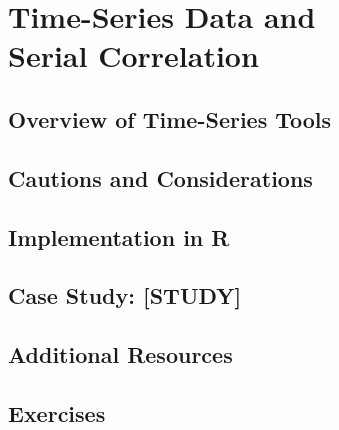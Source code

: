 
\chapter{Time-Series Data and\\ Serial Correlation}

\section{Overview of Time-Series Tools}

\section{Cautions and Considerations}

\section{Implementation in R}

\section{Case Study: [STUDY]}

\section{Additional Resources}

\section{Exercises}